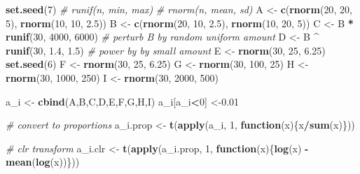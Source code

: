 \documentclass[onecolumn]{book}
\newenvironment{Shaded}{\begin{snugshade}}{\end{snugshade}}
\newcommand{\CommentTok}[1]{\textcolor[rgb]{0.56,0.35,0.01}{\textit{#1}}}
\newcommand{\ControlFlowTok}[1]{\textcolor[rgb]{0.13,0.29,0.53}{\textbf{#1}}}
\newcommand{\DecValTok}[1]{\textcolor[rgb]{0.00,0.00,0.81}{#1}}
\newcommand{\FloatTok}[1]{\textcolor[rgb]{0.00,0.00,0.81}{#1}}
\newcommand{\KeywordTok}[1]{\textcolor[rgb]{0.13,0.29,0.53}{\textbf{#1}}}
\newcommand{\NormalTok}[1]{#1}
\newcommand{\OperatorTok}[1]{\textcolor[rgb]{0.81,0.36,0.00}{\textbf{#1}}}
\newcommand{\StringTok}[1]{\textcolor[rgb]{0.31,0.60,0.02}{#1}}
\theoremstyle{definition}
\theoremstyle{definition}
\theoremstyle{definition}
\theoremstyle{remark}
\begin{document}
\begin{Shaded}
\begin{Highlighting}[]
\KeywordTok{set.seed}\NormalTok{(}\DecValTok{7}\NormalTok{)}
\CommentTok{# runif(n, min, max)}
\CommentTok{# rnorm(n, mean, sd)}
\NormalTok{A <-}\StringTok{ }\KeywordTok{c}\NormalTok{(}\KeywordTok{rnorm}\NormalTok{(}\DecValTok{20}\NormalTok{, }\DecValTok{20}\NormalTok{, }\DecValTok{5}\NormalTok{), }\KeywordTok{rnorm}\NormalTok{(}\DecValTok{10}\NormalTok{, }\DecValTok{10}\NormalTok{, }\FloatTok{2.5}\NormalTok{))}
\NormalTok{B <-}\StringTok{ }\KeywordTok{c}\NormalTok{(}\KeywordTok{rnorm}\NormalTok{(}\DecValTok{20}\NormalTok{, }\DecValTok{10}\NormalTok{, }\FloatTok{2.5}\NormalTok{), }\KeywordTok{rnorm}\NormalTok{(}\DecValTok{10}\NormalTok{, }\DecValTok{20}\NormalTok{, }\DecValTok{5}\NormalTok{))}
\NormalTok{C <-}\StringTok{ }\NormalTok{B }\OperatorTok{*}\StringTok{ }\KeywordTok{runif}\NormalTok{(}\DecValTok{30}\NormalTok{, }\DecValTok{4000}\NormalTok{, }\DecValTok{6000}\NormalTok{) }\CommentTok{# perturb B by random uniform amount}
\NormalTok{D <-}\StringTok{ }\NormalTok{B }\OperatorTok{^}\StringTok{ }\KeywordTok{runif}\NormalTok{(}\DecValTok{30}\NormalTok{, }\FloatTok{1.4}\NormalTok{, }\FloatTok{1.5}\NormalTok{) }\CommentTok{# power by by small amount}
\NormalTok{E <-}\StringTok{ }\KeywordTok{rnorm}\NormalTok{(}\DecValTok{30}\NormalTok{, }\DecValTok{25}\NormalTok{, }\FloatTok{6.25}\NormalTok{)}
\KeywordTok{set.seed}\NormalTok{(}\DecValTok{6}\NormalTok{)}
\NormalTok{F <-}\StringTok{ }\KeywordTok{rnorm}\NormalTok{(}\DecValTok{30}\NormalTok{, }\DecValTok{25}\NormalTok{, }\FloatTok{6.25}\NormalTok{)}
\NormalTok{G <-}\StringTok{ }\KeywordTok{rnorm}\NormalTok{(}\DecValTok{30}\NormalTok{, }\DecValTok{100}\NormalTok{, }\DecValTok{25}\NormalTok{)}
\NormalTok{H <-}\StringTok{ }\KeywordTok{rnorm}\NormalTok{(}\DecValTok{30}\NormalTok{, }\DecValTok{1000}\NormalTok{, }\DecValTok{250}\NormalTok{)}
\NormalTok{I <-}\StringTok{ }\KeywordTok{rnorm}\NormalTok{(}\DecValTok{30}\NormalTok{, }\DecValTok{2000}\NormalTok{, }\DecValTok{500}\NormalTok{)}

\NormalTok{a_i <-}\StringTok{ }\KeywordTok{cbind}\NormalTok{(A,B,C,D,E,F,G,H,I)}
\NormalTok{a_i[a_i}\OperatorTok{<}\DecValTok{0}\NormalTok{] <-}\FloatTok{0.01}

\CommentTok{# convert to proportions}
\NormalTok{a_i.prop <-}\StringTok{ }\KeywordTok{t}\NormalTok{(}\KeywordTok{apply}\NormalTok{(a_i, }\DecValTok{1}\NormalTok{, }\ControlFlowTok{function}\NormalTok{(x)\{x}\OperatorTok{/}\KeywordTok{sum}\NormalTok{(x)\}))}

\CommentTok{# clr transform}
\NormalTok{a_i.clr <-}\StringTok{ }\KeywordTok{t}\NormalTok{(}\KeywordTok{apply}\NormalTok{(a_i.prop, }\DecValTok{1}\NormalTok{, }\ControlFlowTok{function}\NormalTok{(x)\{}\KeywordTok{log}\NormalTok{(x) }\OperatorTok{-}\StringTok{ }\KeywordTok{mean}\NormalTok{(}\KeywordTok{log}\NormalTok{(x))\}))}
\end{Highlighting}
\end{Shaded}
\end{document}
